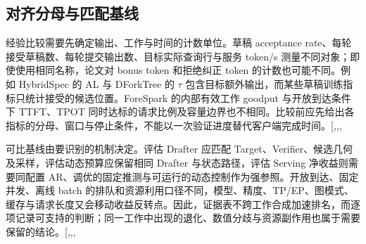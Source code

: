 \documentclass[
  a4paper,
  UTF8,
  fontset=none,
  zihao=5]{ctexart}
\begin{document}
\subsection{对齐分母与匹配基线}\label{comparison}

经验比较需要先确定输出、工作与时间的计数单位。草稿 acceptance
rate、每轮接受草稿数、每轮提交输出数、目标实际查询行与服务 token/s
测量不同对象；即使使用相同名称，论文对 bonus token 和拒绝纠正 token
的计数也可能不同。例如 HybridSpec 的 AL 与 DForkTree 的 \(\tau\)
包含目标额外输出，而某些草稿训练指标只统计接受的候选位置。ForeSpark
的内部有效工作 goodput 与开放到达条件下 TTFT、TPOT
同时达标的请求比例及容量边界也不相同。比较前应先给出各指标的分母、窗口与停止条件，不能以一次验证进度替代客户端完成时间。{[},,,\citeproc{ref-dforktree}{48}{]}

可比基线由要识别的机制决定。评估 Drafter 应匹配
Target、Verifier、候选几何及采样，评估动态预算应保留相同 Drafter
与状态路径，评估 Serving 净收益则需要同配置
AR、调优的固定推测与可运行的动态控制作为强参照。开放到达、固定并发、离线
batch
的排队和资源利用口径不同，模型、精度、TP/EP、图模式、缓存与请求长度又会移动收益反转点。因此，证据表不跨工作合成加速排名，而逐项记录可支持的判断；同一工作中出现的退化、数值分歧与资源副作用也属于需要保留的结论。{[},,,\citeproc{ref-specsearch}{61}{]}
\end{document}
